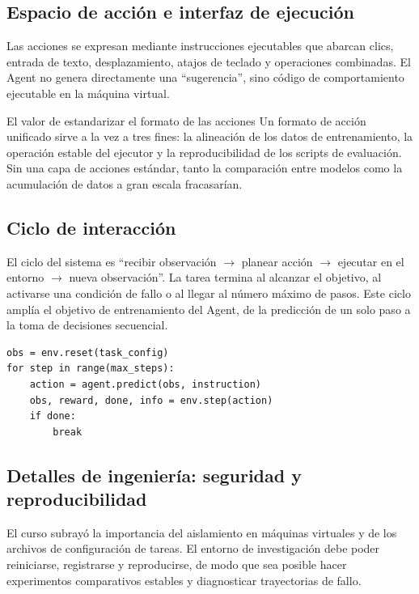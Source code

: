 \documentclass[a4paper]{article}
\begin{document}
\subsection{Espacio de acción e interfaz de ejecución}
Las acciones se expresan mediante instrucciones ejecutables que abarcan clics, entrada de texto, desplazamiento, atajos de teclado y operaciones combinadas. El Agent no genera directamente una ``sugerencia'', sino código de comportamiento ejecutable en la máquina virtual.

\begin{importantbox}{El valor de estandarizar el formato de las acciones}
Un formato de acción unificado sirve a la vez a tres fines: la alineación de los datos de entrenamiento, la operación estable del ejecutor y la reproducibilidad de los scripts de evaluación. Sin una capa de acciones estándar, tanto la comparación entre modelos como la acumulación de datos a gran escala fracasarían.
\end{importantbox}

\subsection{Ciclo de interacción}
El ciclo del sistema es ``recibir observación $\rightarrow$ planear acción $\rightarrow$ ejecutar en el entorno $\rightarrow$ nueva observación''. La tarea termina al alcanzar el objetivo, al activarse una condición de fallo o al llegar al número máximo de pasos. Este ciclo amplía el objetivo de entrenamiento del Agent, de la predicción de un solo paso a la toma de decisiones secuencial.

\begin{lstlisting}[caption={Ciclo de interacción simplificado de un Agent multimodal en OS-World}]
obs = env.reset(task_config)
for step in range(max_steps):
    action = agent.predict(obs, instruction)
    obs, reward, done, info = env.step(action)
    if done:
        break
\end{lstlisting}

\subsection{Detalles de ingeniería: seguridad y reproducibilidad}
El curso subrayó la importancia del aislamiento en máquinas virtuales y de los archivos de configuración de tareas. El entorno de investigación debe poder reiniciarse, registrarse y reproducirse, de modo que sea posible hacer experimentos comparativos estables y diagnosticar trayectorias de fallo.
\end{document}
